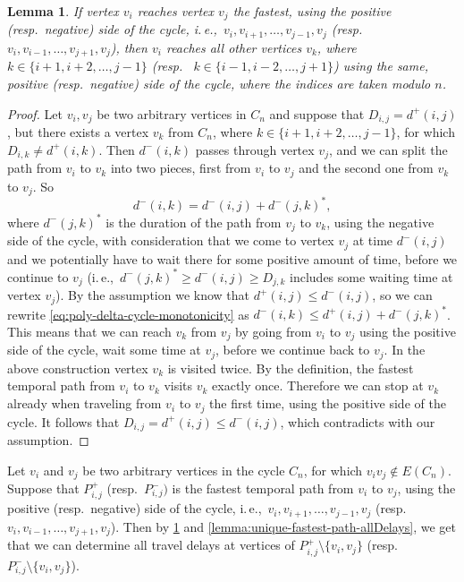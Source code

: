 \documentclass[11pt,a4paper]{article}
\newtheorem{lemma}[theorem]{Lemma}
\theoremstyle{remark}
\theoremstyle{definition}
\newcommand{\ie}{i.\,e.,\ }
\begin{document}
\begin{lemma} \label{lemma:poly-delta-cycle-monotonicity}
    If vertex $v_i$ reaches vertex $v_j$ the fastest, using the positive (resp.~negative) side of the cycle, \ie $v_i, v_{i+1}, \dots, v_{j-1}, v_j$ (resp. $v_i, v_{i-1}, \dots, v_{j+1}, v_j$),
    then $v_i$ reaches all other vertices $v_k$, where $k \in \{i+1, i+2, \dots, j-1\}$ (resp.~ $k \in \{i-1, i-2, \dots, j+1\}$)
    using the same, positive (resp.~negative) side of the cycle,
    where the indices are taken modulo $n$.
\end{lemma}
\begin{proof}
    Let $v_i, v_j$ be two arbitrary vertices in $C_n$ and suppose that $D_{i,j} = d^+(i,j)$,
    but there exists a vertex $v_k$ from $C_n$, where $k \in \{i+1, i+2, \dots, j-1\}$,
    for which $D_{i,k} \neq d^+(i,k)$.
    Then $d^-(i,k)$ passes through vertex $v_j$, and we can split the path from $v_i$ to $v_k$ into two pieces, 
    first from $v_i$ to $v_j$ and the second one from $v_k$ to $v_j$.
    So 
    \begin{equation} \label{eq:poly-delta-cycle-monotonicity}
        d^-(i,k) = d^-(i,j) + d^-(j,k)^*,
    \end{equation} where $d^-(j,k)^*$ is the duration of the path from $v_j$ to $v_k$, using the negative side of the cycle, with consideration that we come to vertex $v_j$ at time $d^-(i,j)$ and we potentially have to wait there for some positive amount of time, before we continue to $v_j$
    (\ie $d^-(j,k)^* \geq d^-(i,j) \geq D_{j,k}$ includes some waiting time at vertex $v_j$).
    By the assumption we know that $d^+(i,j) \leq d^-(i,j)$, so we can rewrite \cref{eq:poly-delta-cycle-monotonicity} as
    $d^-(i,k) \leq d^+(i,j) + d^-(j,k)^*$. This means that we can reach $v_k$ from $v_j$ by going from $v_i$ to $v_j$ using the positive side of the cycle, wait some time at $v_j$, before we continue back to $v_j$.
    In the above construction vertex $v_k$ is visited twice. By the definition, the fastest temporal path from $v_i$ to $v_k$ visits $v_k$ exactly once. Therefore we can stop at $v_k$ already when traveling from $v_i$ to $v_j$ the first time, using the positive side of the cycle.
    It follows that $D_{i,j} = d^+(i,j) \leq d^-(i,j)$, which contradicts with our assumption.
\end{proof}

Let $v_i$ and $v_j$ be two arbitrary vertices in the cycle $C_n$, for which $v_i v_j \notin E(C_n)$.
Suppose that $P^+_{i,j}$ (resp.~$P^-_{i,j})$ is the fastest temporal path from $v_i$ to $v_j$, using the positive (resp.~negative) side of the cycle, 
\ie $v_i, v_{i+1}, \dots, v_{j-1}, v_j$ (resp. $v_i, v_{i-1}, \dots, v_{j+1}, v_j$).
Then by \cref{lemma:poly-delta-cycle-monotonicity} and \cref{lemma:unique-fastest-path-allDelays},
we get that we can determine all travel delays at vertices of $P^+_{i,j} \setminus \{v_i, v_j\}$ (resp.~$P^-_{i,j} \setminus \{v_i, v_j\}$).
\end{document}
